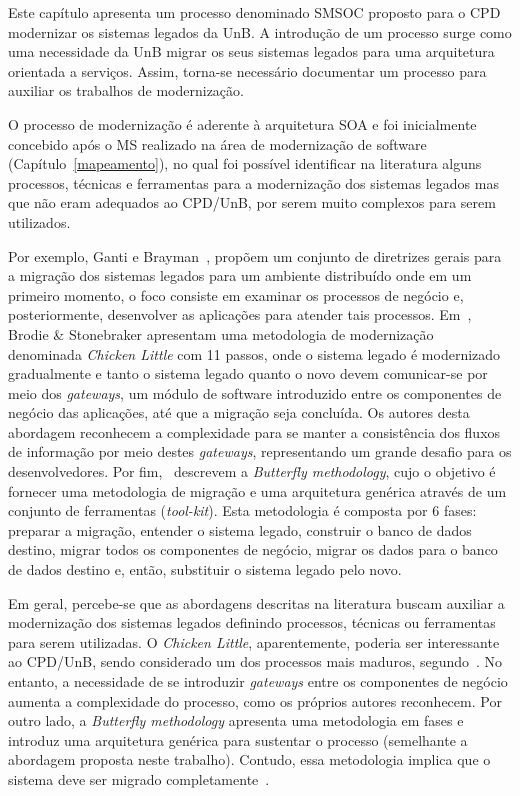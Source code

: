 
\label{processo}

Este capítulo apresenta 
um processo
denominado \acrfull{SMSOC} proposto para o CPD
modernizar os sistemas legados da \acrlong{UnB}. 
A introdução 
de um processo surge como uma necessidade
da \acrshort{UnB} migrar os seus 
sistemas legados para uma arquitetura 
orientada a serviços. Assim,
torna-se necessário documentar um processo 
para auxiliar os trabalhos de modernização.

O processo de modernização é 
aderente à arquitetura \acrshort{SOA} e
foi inicialmente concebido após o \acrfull{MS} 
realizado na área de modernização de software (Capítulo~\ref{mapeamento}), 
no qual foi possível identificar na literatura 
alguns processos, técnicas e ferramentas
para a modernização dos sistemas legados 
mas que não eram adequados ao CPD/UnB, 
por serem muito complexos para serem utilizados.


Por exemplo,
Ganti e Brayman~\cite{ganti1995transition},
propõem um conjunto de diretrizes gerais
para a migração dos sistemas legados
para um ambiente distribuído onde
em um primeiro momento, 
o foco consiste em examinar os processos de 
negócio e, posteriormente, 
desenvolver as aplicações 
para atender tais processos.
Em~\cite{brodie1993darwin,brodie1995migrating},
Brodie \& Stonebraker apresentam
uma metodologia de modernização denominada \emph{Chicken Little} 
com 11 passos, onde 
o sistema legado é modernizado gradualmente e 
tanto o sistema legado quanto o novo 
devem comunicar-se
por meio dos \emph{gateways}, um módulo
de software introduzido entre os componentes
de negócio das aplicações, até que a migração
seja concluída. Os autores 
desta abordagem reconhecem a complexidade 
para se manter a consistência dos fluxos 
de informação por meio destes
\emph{gateways}, representando um 
grande desafio para os desenvolvedores. 
Por fim,~\cite{S35_BingWu:1997,S13_wu1997butterfly:1997}
descrevem a \emph{Butterfly methodology},
cujo o objetivo é fornecer uma metodologia de migração 
e uma arquitetura genérica através de
um conjunto de ferramentas (\textit{tool-kit}). 
Esta metodologia é composta por 
6 fases: preparar a migração, 
entender o sistema legado, construir o banco de dados
destino, migrar todos os componentes de negócio, 
migrar os dados para o banco de dados destino e, 
então, substituir o sistema legado pelo novo.

Em geral, percebe-se que
as abordagens descritas
na literatura buscam auxiliar
a modernização dos sistemas legados 
definindo processos, técnicas ou ferramentas
para serem utilizadas.
O \textit{Chicken Little}, aparentemente,
poderia ser interessante ao CPD/UnB, sendo
considerado um dos processos 
mais maduros, segundo~\cite{S35_BingWu:1997}. 
No entanto, a necessidade de se introduzir \textit{gateways}
entre os componentes de negócio aumenta a 
complexidade do processo, como os próprios autores
reconhecem. Por outro lado, a \emph{Butterfly methodology}
apresenta uma metodologia em fases e 
introduz uma arquitetura genérica
para sustentar o processo (semelhante a 
abordagem proposta neste trabalho).
Contudo, essa metodologia implica 
que o sistema deve ser migrado 
completamente~\cite{S13_wu1997butterfly:1997}.


